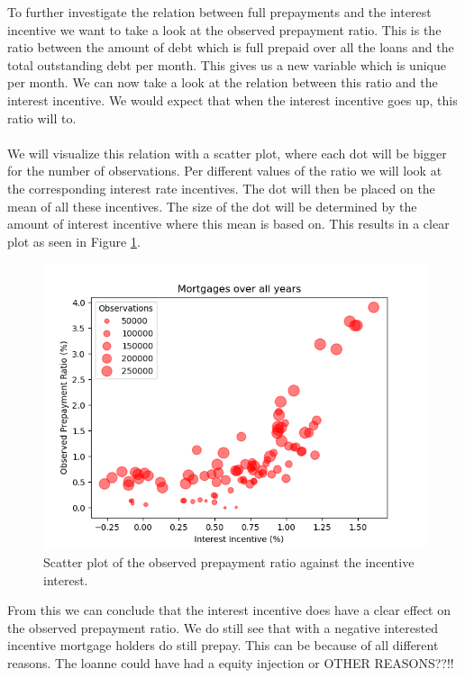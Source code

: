     To further investigate the relation between full prepayments and 
    the interest incentive we want to take a look at the observed 
    prepayment ratio. This is the ratio between the amount of debt 
    which is full prepaid over all the loans and the total outstanding 
    debt per month. This gives us a new variable which is unique per 
    month. We can now take a look at the relation between this ratio 
    and the interest incentive. We would expect that when the 
    interest incentive goes up, this ratio will to. 
    \\\\
    We will visualize this relation with a scatter plot, where each 
    dot will be bigger for the number of observations. Per different 
    values of the ratio we will look at the corresponding interest 
    rate incentives. The dot will then be placed on the mean of all 
    these incentives. The size of the dot will be determined by the 
    amount of interest incentive where this mean is based on. This 
    results in a clear plot as seen in Figure \ref{scatter_interest}.
    \begin{figure}[H]
        \centering
        \includegraphics[scale=0.7]{Figures/Bubbles_all_years.png}
        \caption{Scatter plot of the observed prepayment ratio against the incentive interest.}
        \label{scatter_interest}
    \end{figure}
    From this we can conclude that the interest incentive does have 
    a clear effect on the observed prepayment ratio. We do still 
    see that with a negative interested incentive mortgage holders 
    do still prepay. This can be because of all different reasons. 
    The loanne could have had a equity injection or OTHER REASONS??!!